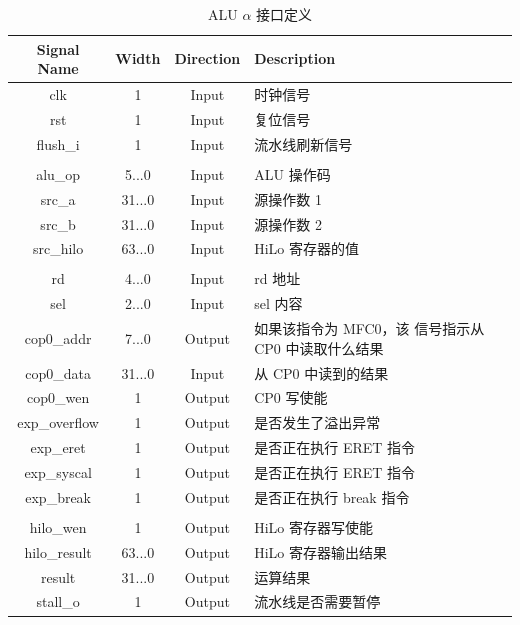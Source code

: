 \documentclass[blue,normal,cn,hide]{elegantbook}
\begin{document}
\begin{table}
    \renewcommand\arraystretch{1.25}
    \centering
    \begin{tabular}{cccm{}}
        \toprule 
        \rowcolor{black!20} \textbf{Signal Name} & \textbf{Width} & \textbf{Direction} & \textbf{Description} \\
        \midrule
        clk & 1 & Input & 时钟信号\\
        rst & 1 & Input & 复位信号\\
        flush\_i & 1 &Input & 流水线刷新信号\\
        \\
        alu\_op & 5...0 & Input & ALU 操作码\\
        src\_a & 31...0 & Input & 源操作数 1\\
        src\_b & 31...0 & Input & 源操作数 2\\
        src\_hilo & 63...0 & Input & HiLo 寄存器的值\\
        \\
        rd & 4...0 & Input & rd 地址\\
        sel & 2...0 & Input & sel 内容\\
        cop0\_addr & 7...0 & Output & 如果该指令为 MFC0，该
        信号指示从 CP0 中读取什么结果\\
        cop0\_data & 31...0 & Input & 从 CP0 中读到的结果\\
        cop0\_wen & 1 & Output & CP0 写使能\\
        exp\_overflow & 1 & Output & 是否发生了溢出异常\\
        exp\_eret & 1 & Output & 是否正在执行 ERET 指令\\
        exp\_syscal & 1 & Output & 是否正在执行 ERET 指令\\
        exp\_break & 1 & Output & 是否正在执行 break 指令\\
        \\
        hilo\_wen & 1 & Output & HiLo 寄存器写使能\\
        hilo\_result & 63...0 & Output & HiLo 寄存器输出结果\\
        result & 31...0 & Output & 运算结果\\
        stall\_o & 1 & Output & 流水线是否需要暂停\\
        \bottomrule
    \end{tabular}
    \caption{ALU $\alpha$ 接口定义}
    \label{tab:ALUAlphaInterface}
\end{table}
\end{document}
